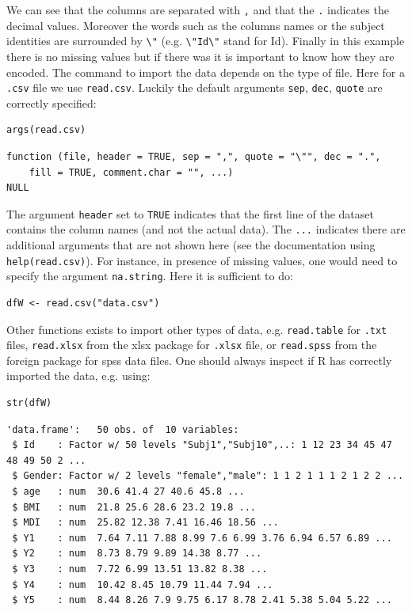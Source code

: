 \documentclass{article}
\begin{document}
We can see that the columns are separated with \texttt{,} and that the \texttt{.}
indicates the decimal values. Moreover the words such as the columns
names or the subject identities are surrounded by \texttt{\textbackslash{}"} (e.g. \texttt{\textbackslash{}"Id\textbackslash{}"}
stand for Id). Finally in this example there is no missing values but
if there was it is important to know how they are encoded. The command
to import the data depends on the type of file. Here for a \texttt{.csv} file
we use \texttt{read.csv}. Luckily the default arguments \texttt{sep}, \texttt{dec}, \texttt{quote}
are correctly specified:
\lstset{language=r,label= ,caption= ,captionpos=b,numbers=none}
\begin{lstlisting}
args(read.csv)
\end{lstlisting}

\begin{verbatim}
function (file, header = TRUE, sep = ",", quote = "\"", dec = ".", 
    fill = TRUE, comment.char = "", ...) 
NULL
\end{verbatim}

The argument \texttt{header} set to \texttt{TRUE} indicates that the first line of
the dataset contains the column names (and not the actual data). The
\texttt{...} indicates there are additional arguments that are not shown here
(see the documentation using \texttt{help(read.csv)}). For instance, in
presence of missing values, one would need to specify the argument
\texttt{na.string}. Here it is sufficient to do:
\lstset{language=r,label= ,caption= ,captionpos=b,numbers=none}
\begin{lstlisting}
dfW <- read.csv("data.csv")
\end{lstlisting}

Other functions exists to import other types of data,
e.g. \texttt{read.table} for \texttt{.txt} files, \texttt{read.xlsx} from the xlsx package
for \texttt{.xlsx} file, or \texttt{read.spss} from the foreign package for spss
data files. One should always inspect if R has correctly imported the
data, e.g. using:
\lstset{language=r,label= ,caption= ,captionpos=b,numbers=none}
\begin{lstlisting}
str(dfW)
\end{lstlisting}

\begin{verbatim}
'data.frame':	50 obs. of  10 variables:
 $ Id    : Factor w/ 50 levels "Subj1","Subj10",..: 1 12 23 34 45 47 48 49 50 2 ...
 $ Gender: Factor w/ 2 levels "female","male": 1 1 2 1 1 1 2 1 2 2 ...
 $ age   : num  30.6 41.4 27 40.6 45.8 ...
 $ BMI   : num  21.8 25.6 28.6 23.2 19.8 ...
 $ MDI   : num  25.82 12.38 7.41 16.46 18.56 ...
 $ Y1    : num  7.64 7.11 7.88 8.99 7.6 6.99 3.76 6.94 6.57 6.89 ...
 $ Y2    : num  8.73 8.79 9.89 14.38 8.77 ...
 $ Y3    : num  7.72 6.99 13.51 13.82 8.38 ...
 $ Y4    : num  10.42 8.45 10.79 11.44 7.94 ...
 $ Y5    : num  8.44 8.26 7.9 9.75 6.17 8.78 2.41 5.38 5.04 5.22 ...
\end{verbatim}
\end{document}
